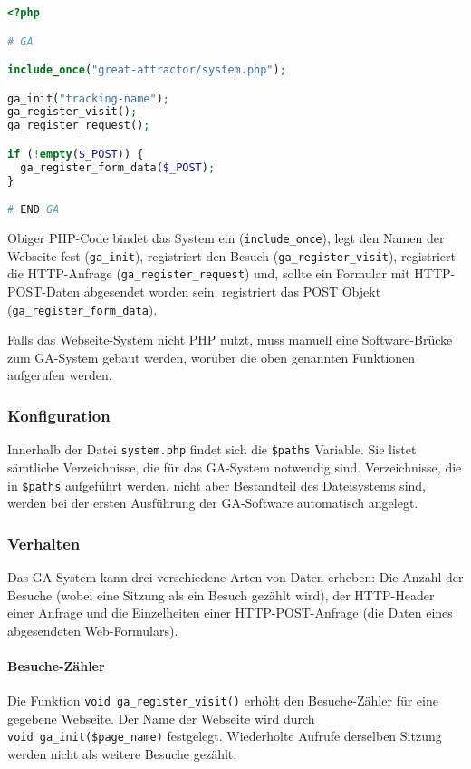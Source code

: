 \begin{lstlisting}[language=PHP]
<?php

# GA

include_once("great-attractor/system.php");

ga_init("tracking-name");
ga_register_visit();
ga_register_request();

if (!empty($_POST)) {
  ga_register_form_data($_POST);
}

# END GA
\end{lstlisting}

Obiger PHP-Code bindet das System ein (\texttt{include\_once}), legt den Namen
der Webseite fest (\texttt{ga\_init}), registriert den Besuch
(\texttt{ga\_register\_visit}), registriert die HTTP-Anfrage
(\texttt{ga\_register\_request}) und, sollte ein Formular mit HTTP-POST-Daten
abgesendet worden sein, registriert das POST Objekt
(\texttt{ga\_register\_form\_data}).

Falls das Webseite-System nicht PHP nutzt, muss manuell eine Software-Brücke
zum GA-System gebaut werden, worüber die oben genannten Funktionen aufgerufen
werden.

\subsubsection{Konfiguration}
\label{ssub:ga_konfiguration}
Innerhalb der Datei \texttt{system.php} findet sich die \texttt{\$paths}
Variable. Sie listet sämtliche Verzeichnisse, die für das GA-System notwendig
sind. Verzeichnisse, die in \texttt{\$paths} aufgeführt werden, nicht aber
Bestandteil des Dateisystems sind, werden bei der ersten Ausführung der
GA-Software automatisch angelegt.

\subsubsection{Verhalten}
\label{ssub:verhalten}
Das GA-System kann drei verschiedene Arten von Daten erheben: Die Anzahl der
Besuche (wobei eine Sitzung als ein Besuch gezählt wird), der HTTP-Header einer
Anfrage und die Einzelheiten einer HTTP-POST-Anfrage (die Daten eines
abgesendeten Web-Formulars).

\paragraph{Besuche-Zähler}
\label{par:ga_besuche_zahler}
Die Funktion \texttt{void\ ga\_register\_visit()} erhöht den Besuche-Zähler für
eine gegebene Webseite. Der Name der Webseite wird durch \texttt{void\
ga\_init(\$page\_name)} festgelegt. Wiederholte Aufrufe derselben Sitzung
werden nicht als weitere Besuche gezählt.

